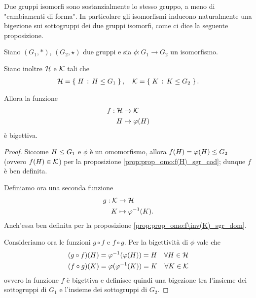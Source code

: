 Due gruppi isomorfi sono sostanzialmente lo stesso gruppo, a meno di "cambiamenti di forma". In particolare gli isomorfismi inducono naturalmente una bigezione sui sottogruppi dei due gruppi isomorfi, come ci dice la seguente proposizione.

\begin{proposition}
     \label{prop:big_sottogrp_isom}
    Siano $(G_1, *)$, $(G_2, \star)$ due gruppi e sia $\phi : G_1 \to G_2$ un isomorfismo.

    Siano inoltre $\mathcal{H}$ e $\mathcal{K}$ tali che \begin{align*}
        \mathcal{H} = \left\{\;H \,:\, H \leq G_1\;\right\}, \quad \mathcal{K} = \left\{\;K \,:\, K \leq G_2\;\right\}.
    \end{align*}

    Allora la funzione \begin{align*}
        f : \mathcal{H} &\to \mathcal{K} \\
        H &\mapsto \varphi(H)
    \end{align*} è bigettiva.
\end{proposition}
\begin{proof}
    Siccome $H \leq G_1$ e $\phi$ è un omomorfismo, allora $f(H) = \varphi(H) \leq G_2$ (ovvero $f(H) \in \mathcal{K}$) per la proposizione \ref{prop:prop_omo:f(H)_sgr_cod}; dunque $f$ è ben definita.

    Definiamo ora una seconda funzione \begin{align*}
        g : \mathcal{K} &\to \mathcal{H}\\
        K &\mapsto \varphi^{-1}(K).
    \end{align*} Anch'essa ben definita per la proposizione \ref{prop:prop_omo:f\inv(K)_sgr_dom}.

    Consideriamo ora le funzioni $g \circ f$ e $f \circ g$. Per la bigettività di $\phi$ vale che \begin{align*}
        &(g \circ f)(H) = \varphi^{-1}(\varphi(H)) = H &\forall H \in \mathcal{H}\\
        &(f \circ g)(K) = \varphi(\varphi^{-1}(K)) = K &\forall K \in \mathcal{K}
    \end{align*} ovvero la funzione $f$ è bigettiva e definisce quindi una bigezione tra l'insieme dei sottogruppi di $G_1$ e l'insieme dei sottogruppi di $G_2$.
\end{proof}


